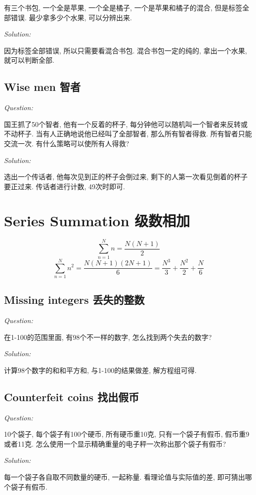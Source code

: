 \documentclass[12pt]{book}
\begin{document}
有三个书包, 一个全是苹果, 一个全是橘子, 一个是苹果和橘子的混合, 但是标签全部错误. 最少拿多少个水果, 可以分辨出来.

\noindent \textit{Solution:} 

因为标签全部错误, 所以只需要看混合书包. 混合书包一定的纯的, 拿出一个水果, 就可以判断全部.

\subsection{Wise men 智者}
\noindent \textit{Question:}

国王抓了50个智者, 他有一个反着的杯子, 每分钟他可以随机叫一个智者来反转或不动杯子. 当有人正确地说他已经叫了全部智者, 那么所有智者得救. 所有智者只能交流一次. 有什么策略可以使所有人得救?

\noindent \textit{Solution:} 

选出一个传话者, 他每次见到正的杯子会倒过来, 剩下的人第一次看见倒着的杯子要正过来. 传话者进行计数, 49次时即可.

\section{Series Summation 级数相加}
$$\sum_{n=1}^N n =\frac{N(N+1)}{2} $$
$$\sum_{n=1}^N n^2=\frac{N(N+1)(2N+1)}{6}=\frac{N^3}{3}+\frac{N^2}{2}+\frac{N}{6}$$

\subsection{Missing integers 丢失的整数}
\noindent \textit{Question:}

在1-100的范围里面, 有98个不一样的数字, 怎么找到两个失去的数字?

\noindent \textit{Solution:} 

计算98个数字的和和平方和, 与1-100的结果做差, 解方程组可得.

\subsection{Counterfeit coins 找出假币}
\noindent \textit{Question:}

10个袋子, 每个袋子有100个硬币, 所有硬币重10克, 只有一个袋子有假币, 假币重9或者11克. 怎么使用一个显示精确重量的电子秤一次称出那个袋子有假币?

\noindent \textit{Solution:} 

每一个袋子各自取不同数量的硬币, 一起称量. 看理论值与实际值的差, 即可猜出哪个袋子有假币.
\end{document}

